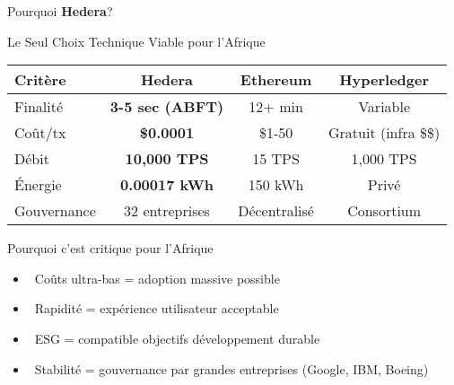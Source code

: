 \documentclass[aspectratio=169,11pt]{beamer}
\newcommand{\hedera}{\textbf{Hedera}\texttrademark}
\begin{document}
\begin{frame}{Pourquoi \hedera?}

\begin{block}{Le Seul Choix Technique Viable pour l'Afrique}
\vspace{0.2cm}
\centering
\small
\begin{tabular}{|l|c|c|c|}
\hline
\textbf{Critère} & \textbf{\hedera} & \textbf{Ethereum} & \textbf{Hyperledger} \\
\hline
Finalité & \textcolor{successGreen}{\textbf{3-5 sec (ABFT)}} & 12+ min & Variable \\
\hline
Coût/tx & \textcolor{successGreen}{\textbf{\$0.0001}} & \$1-50 & Gratuit (infra \$\$) \\
\hline
Débit & \textcolor{successGreen}{\textbf{10,000 TPS}} & 15 TPS & 1,000 TPS \\
\hline
Énergie & \textcolor{successGreen}{\textbf{0.00017 kWh}} & 150 kWh & Privé \\
\hline
Gouvernance & 32 entreprises & Décentralisé & Consortium \\
\hline
\end{tabular}
\end{block}

\vspace{0.3cm}

\begin{alertblock}{Pourquoi c'est critique pour l'Afrique}
\begin{itemize}
    \item \faMoneyBillWave~Coûts ultra-bas = adoption massive possible
    \item \faBolt~Rapidité = expérience utilisateur acceptable
    \item \faLeaf~ESG = compatible objectifs développement durable
    \item \faShieldAlt~Stabilité = gouvernance par grandes entreprises (Google, IBM, Boeing)
\end{itemize}
\end{alertblock}

\end{frame}
\end{document}
